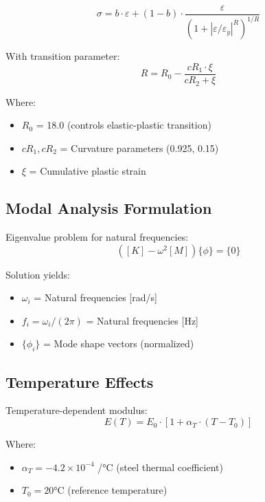 \documentclass[12pt,a4paper]{article}
\begin{document}
\begin{equation}
\sigma = b \cdot \varepsilon + (1-b) \cdot \frac{\varepsilon}{(1 + |\varepsilon/\varepsilon_y|^R)^{1/R}}
\end{equation}

With transition parameter:
\begin{equation}
R = R_0 - \frac{cR_1 \cdot \xi}{cR_2 + \xi}
\end{equation}

Where:
\begin{itemize}
    \item $R_0$ = 18.0 (controls elastic-plastic transition)
    \item $cR_1, cR_2$ = Curvature parameters (0.925, 0.15)
    \item $\xi$ = Cumulative plastic strain
\end{itemize}

\subsection{Modal Analysis Formulation}

Eigenvalue problem for natural frequencies:
\begin{equation}
([K] - \omega^2[M])\{\phi\} = \{0\}
\end{equation}

Solution yields:
\begin{itemize}
    \item $\omega_i$ = Natural frequencies [rad/s]
    \item $f_i = \omega_i/(2\pi)$ = Natural frequencies [Hz]
    \item $\{\phi_i\}$ = Mode shape vectors (normalized)
\end{itemize}

\subsection{Temperature Effects}

Temperature-dependent modulus:
\begin{equation}
E(T) = E_0 \cdot [1 + \alpha_T \cdot (T - T_0)]
\end{equation}

Where:
\begin{itemize}
    \item $\alpha_T = -4.2 \times 10^{-4}$ /°C (steel thermal coefficient)
    \item $T_0 = 20$°C (reference temperature)
\end{itemize}
\end{document}
